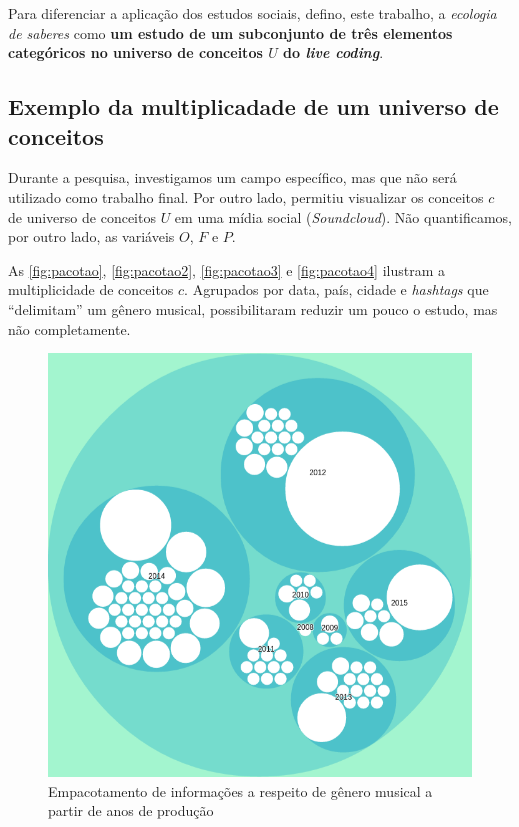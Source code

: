 Para diferenciar a aplicação dos estudos sociais, defino, este trabalho, a \emph{ecologia de saberes} como \textbf{um estudo de um subconjunto de três elementos categóricos no universo de conceitos $U$ do \emph{live coding}}.

\subsection{Exemplo da multiplicadade de um universo de conceitos}

Durante a pesquisa, investigamos um campo específico, mas que não será utilizado como trabalho final. Por outro lado, permitiu visualizar os conceitos  $c$ de universo de conceitos $U$ em uma mídia social (\emph{Soundcloud}). Não quantificamos, por outro lado, as variáveis $O$, $F$ e $P$.

As \autoref{fig:pacotao}, \autoref{fig:pacotao2}, \autoref{fig:pacotao3} e \autoref{fig:pacotao4} ilustram a multiplicidade de conceitos $c$. Agrupados por data, país, cidade e \emph{hashtags} que ``delimitam'' um gênero musical, possibilitaram reduzir um pouco o estudo, mas não completamente.

\begin{figure}[h]
\begin{center}
\includegraphics[scale=0.6]{./imagens/zoomable_circle_packing_genre_year_livecoding.png}
\caption{Empacotamento de informações a respeito de gênero musical a partir de anos de produção}
\label{fig:pacotao}
\end{center}
\end{figure}

